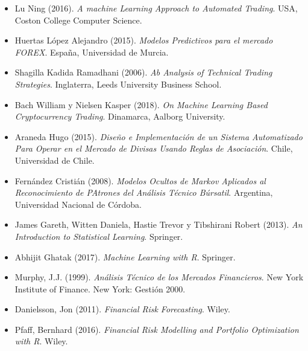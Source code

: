 \documentclass[a4paper,12pt]{Latex/Classes/PhDthesisPSnPDF}
\begin{document}
\begin{itemize}

\item Lu Ning (2016). \textit{A machine Learning Approach to Automated Trading}. USA, Coston College Computer Science.

\item Huertas López Alejandro (2015). \textit{Modelos Predictivos para el mercado FOREX}. España, Universidad de Murcia.

\item Shagilla Kadida Ramadhani (2006). \textit{Ab Analysis of Technical Trading Strategies}. Inglaterra, Leeds University Business School.

\item Bach William y Nielsen Kasper (2018). \textit{On Machine Learning Based Cryptocurrency Trading}. Dinamarca, Aalborg University.

\item Araneda Hugo (2015). \textit{Diseño e Implementación de un Sistema Automatizado Para Operar en el Mercado de Divisas Usando Reglas de Asociación}. Chile, Universidad de Chile.

\item Fernández Cristián (2008). \textit{Modelos Ocultos de Markov Aplicados al Reconocimiento de PAtrones del Análisis Técnico Búrsatil}. Argentina, Universidad Nacional de Córdoba.

\item James Gareth, Witten Daniela, Hastie Trevor y Tibshirani Robert (2013). \textit{An Introduction to Statistical Learning}. Springer.

\item Abhijit Ghatak (2017). \textit{Machine Learning with R}. Springer.

\item Murphy, J.J. (1999). \textit{Análisis Técnico de los Mercados Financieros}. New York Institute of Finance. New York: Gestión 2000.

\item Danielsson, Jon (2011). \textit{Financial Risk Forecasting}. Wiley.

\item Pfaff, Bernhard (2016). \textit{Financial Risk Modelling and
Portfolio Optimization with R}. Wiley.

\end{itemize}
\end{document}
